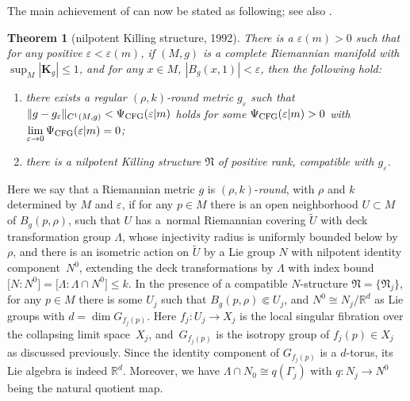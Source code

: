 \documentclass[pdftex]{sigma}
\numberwithin{equation}{section}
\newtheorem{Theorem}{Theorem}[section]
\begin{document}
The main achievement of \cite{CFG92} can now be stated as following; see also
\cite[Theorem~5.1]{Rong07}.
\begin{Theorem}[nilpotent Killing structure, 1992]\label{thm: CFG}
There is a $\varepsilon(m)>0$ such that for any positive $\varepsilon
<\varepsilon(m)$, if $(M,g)$ is a complete Riemannian manifold with
$\sup_M |\mathbf{K}_g |\le 1$, and for any $x\in M$, $|B_g(x,1)|<\varepsilon$, then the following hold:
\begin{enumerate}\itemsep=0pt
 \item[$1)$] there exists a regular $(\rho,k)$-round metric
 $g_{\varepsilon}$ such that
 $ \|g-g_{\varepsilon} \|_{C^1(M,g)}<\Psi_{\rm CFG}(\varepsilon|m)$ holds
 for some $\Psi_{\rm CFG}(\varepsilon|m)>0$ with
 $\lim\limits_{\varepsilon \to 0}\Psi_{\rm CFG}(\varepsilon|m)=0$;
 \item[$2)$] there is a nilpotent Killing structure $\mathfrak{N}$ of positive rank,
 compatible with $g_{\varepsilon}$.
 \end{enumerate}
\end{Theorem}
Here we say that a Riemannian metric $g$ is $(\rho,k)$-\emph{round}, with $\rho$
and $k$ determined by $M$ and $\varepsilon$, if for any $p\in M$ there is
an open neighborhood $U\subset M$ of $B_g(p,\rho)$, such that $U$ has a~normal
Riemannian covering $\tilde{U}$ with deck transformation group $\Lambda$, whose
injectivity radius is uniformly bounded below by $\rho$, and there is an
isometric action on $\tilde{U}$ by a Lie group $N$ with nilpotent identity
component~$N^0$, extending the deck transformations by $\Lambda$ with index bound
$\big[N:N^0\big] = \big[\Lambda:\Lambda\cap N^0\big] \le k$.
In the presence of a compatible $N$-structure $\mathfrak{N}=\{\mathfrak{N}_j\}$,
for any $p\in M$ there is some $U_j$ such that $B_g(p,\rho)\Subset U_j$, and
$N^0\cong N_j\slash \mathbb{R}^d$ as Lie groups with $d=\dim G_{f_j(p)}$. Here
$f_j\colon U_j\to X_j$ is the local singular fibration over the collapsing limit
space~$X_j$, and~$G_{f_j(p)}$ is the isotropy group of $f_j(p)\in X_j$ as
discussed previously. Since the identity component of $G_{f_j(p)}$ is a
$d$-torus, its Lie algebra is indeed $\mathbb{R}^d$.
Moreover, we have $\Lambda\cap N_0\cong q(\Gamma_j)$ with $q\colon N_j\to N^0$ being
the natural quotient map.
\end{document}
